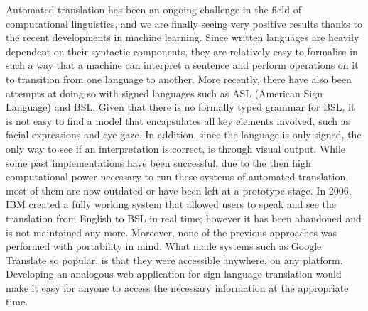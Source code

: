 \documentclass[12pt]{ociamthesis}  %
\begin{document}
Automated translation has been an ongoing challenge in the field of computational linguistics, and we are finally seeing very positive results thanks to the recent developments in machine learning. Since written languages are heavily dependent on their syntactic components, they are relatively easy to formalise in such a way that a machine can interpret a sentence and perform operations on it to transition from one language to another. More recently, there have also been attempts at doing so with signed languages such as ASL (American Sign Language) and BSL. Given that there is no formally typed grammar for BSL, it is not easy to find a model that encapsulates all key elements involved, such as facial expressions and eye gaze. In addition, since the language is only signed, the only way to see if an interpretation is correct, is through visual output. While some past implementations have been successful, due to the then high computational power necessary to run these systems of automated translation, most of them are now outdated or have been left at a prototype stage. In 2006, IBM created a fully working system  that allowed users to speak and see the translation from English to BSL in real time; however it has been abandoned and is not maintained any more. Moreover, none of the previous approaches was performed with portability in mind. What made systems such as Google Translate so popular, is that they were accessible anywhere, on any platform. Developing an analogous web application for sign language translation would make it easy for anyone to access the necessary information at the appropriate time. 
\end{document}

